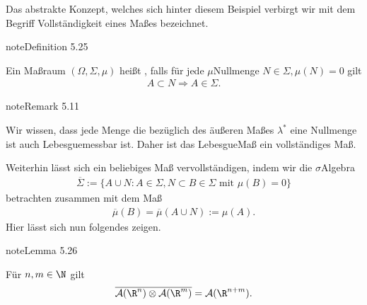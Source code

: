 \documentclass[letterpaper,10pt,german]{jupyterBook}
\begin{document}
\sphinxAtStartPar
Das abstrakte Konzept, welches sich hinter diesem Beispiel verbirgt wir mit dem Begriff Vollständigkeit eines Maßes bezeichnet.
\label{masstheorie/integrationstechnik:definition-3}
\begin{sphinxadmonition}{note}{Definition 5.25}



\sphinxAtStartPar
Ein Maßraum \((\Omega,\Sigma,\mu)\) heißt , falls für jede \(\mu\)\sphinxhyphen{}Nullmenge \(N\in\Sigma, \mu(N)=0\) gilt
\begin{equation*}
\begin{split}A\subset N \Rightarrow A\in \Sigma.\end{split}
\end{equation*}\end{sphinxadmonition}
\label{masstheorie/integrationstechnik:remark-4}
\begin{sphinxadmonition}{note}{Remark 5.11}



\sphinxAtStartPar
Wir wissen, dass jede Menge die bezüglich des äußeren Maßes \(\lambda^\ast\) eine Nullmenge ist auch Lebesgue\sphinxhyphen{}messbar ist. Daher ist das Lebesgue\sphinxhyphen{}Maß ein vollständiges Maß.
\end{sphinxadmonition}

\sphinxAtStartPar
Weiterhin lässt sich ein beliebiges Maß vervollständigen, indem wir die \(\sigma\)\sphinxhyphen{}Algebra
\begin{equation*}
\begin{split}\overline{\Sigma}:=\{A\cup N: A\in\Sigma, N\subset B\in\Sigma\text{ mit }\mu(B)=0\}\end{split}
\end{equation*}
\sphinxAtStartPar
betrachten zusammen mit dem Maß
\begin{equation*}
\begin{split}\overline{\mu}(B)= \overline{\mu}(A\cup N):= \mu(A).\end{split}
\end{equation*}
\sphinxAtStartPar
Hier lässt sich nun folgendes zeigen.
\label{masstheorie/integrationstechnik:lem:completelebesgue}
\begin{sphinxadmonition}{note}{Lemma 5.26}



\sphinxAtStartPar
Für \(n,m\in\N\) gilt
\begin{equation*}
\begin{split}\overline{\mathcal{A}(\R^n)\otimes\mathcal{A}(\R^m)}= \mathcal{A}(\R^{n+m}).\end{split}
\end{equation*}\end{sphinxadmonition}
\end{document}
